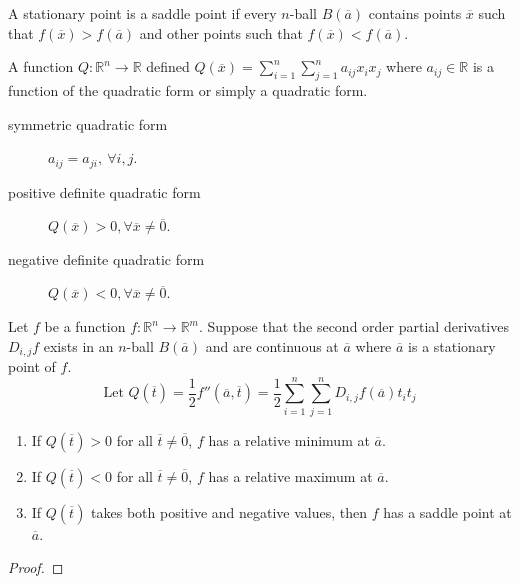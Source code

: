 \begin{definition}
	A stationary point is a saddle point if every $n$-ball $B(\overline{a})$ contains points $\overline{x}$ such that $f(\overline{x}) > f(\overline{a})$ and other points such that $f(\overline{x}) < f(\overline{a})$.
\end{definition}

\begin{definition}
	A function $Q : \mathbb{R}^n \to \mathbb{R}$ defined $Q(\overline{x}) = \sum_{i=1}^n \sum_{j=1}^n a_{ij}x_ix_j$ where $a_{ij} \in \mathbb{R}$ is a function of the quadratic form or simply a quadratic form.
	\begin{description}
		\item[symmetric quadratic form] $a_{ij} = a_{ji},\ \forall i,j$. 
		\item[positive definite quadratic form] $Q(\overline{x}) > 0, \forall \overline{x} \ne \overline{0}$. 
		\item[negative definite quadratic form] $Q(\overline{x}) < 0, \forall \overline{x} \ne \overline{0}$. 
	\end{description}
\end{definition}

\begin{theorem}
	Let $f$ be a function $f : \mathbb{R}^n \to \mathbb{R}^m$. Suppose that the second order partial derivatives $D_{i,j}f$ exists in an $n$-ball $B(\overline{a})$ and are continuous at $\overline{a}$ where $\overline{a}$ is a stationary point of $f$.
	\[ \text{Let } Q(\overline{t}) = \frac{1}{2} f''(\overline{a},\overline{t}) = \frac{1}{2} \sum_{i = 1}^n \sum_{j = 1}^n D_{i,j} f(\overline{a})t_it_j \]
	\begin{enumerate}
		\item If $Q(\overline{t}) > 0$ for all $\overline{t} \ne \overline{0}$, $f$ has a relative minimum at $\overline{a}$.
		\item If $Q(\overline{t}) < 0$ for all $\overline{t} \ne \overline{0}$, $f$ has a relative maximum at $\overline{a}$.
		\item If $Q(\overline{t})$ takes both positive and negative values, then $f$ has a saddle point at $\overline{a}$.
	\end{enumerate}
\end{theorem}
\begin{proof}
\end{proof}


